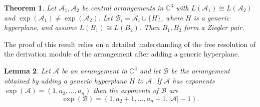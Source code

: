 \documentclass[a4paper,11pt]{amsart}
\def\CC{{\mathbb{C}}}%
\def\C{{\mathbb{C}}}%
\def\A{{\mathcal{A}}}%
\def\B{{\mathcal{B}}}%
\def\C{{\mathcal{C}}}%
\numberwithin{equation}{section}
\newtheorem{theorem}{Theorem}[section]
\newtheorem{lemma}[theorem]{Lemma}
\theoremstyle{remark}
\begin{document}
\begin{theorem}\label{main}
Let \(\mathcal{A}_1,\mathcal{A}_2\) be central arrangements in \(\mathbb C^3\) with
\(L(\mathcal{A}_1)\cong L(\mathcal{A}_2)\) and \(\exp(\mathcal{A}_1)\ne \exp(\mathcal{A}_2)\).
Let \(\mathcal{B}_i=\mathcal{A}_i\cup\{H\}\), where \(H\) is a generic hyperplane, and assume \(L(B_1)\cong L(B_2)\). Then \(B_1,B_2\) form a Ziegler pair.
\end{theorem}

The proof of this result relies on a detailed understanding of the free resolution of the derivation module of the arrangement after adding a generic hyperplane.

\begin{lemma}\label{lem:generic_addition}
	Let $\A$ be an arrangement in $\CC^3$ and let $\B$ be the arrangement obtained by adding a generic hyperplane $H$ to $\A$.
	If $\A$ has exponents $\exp(\A)=(1,a_2,\dots,a_n)$ then the exponents of $\B$ are 
	\[
	\exp(\B)=(1,a_2+1,\dots,a_n+1,|\A|-1).
	\]
\end{lemma}
\end{document}
